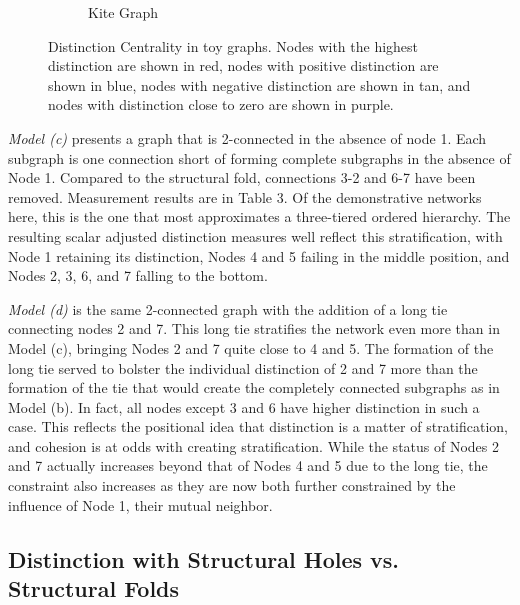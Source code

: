 \documentclass[12pt]{article}
\begin{document}
\begin{figure}
\begin{subfigure}[b]{0.35\textwidth}
            \caption{Kite Graph}
            \label{fig:kite}
    \end{subfigure}
    \caption{Distinction Centrality in toy graphs. Nodes with the highest distinction are shown in red, nodes with positive distinction are shown in blue, nodes with negative distinction are shown in tan, and nodes with distinction close to zero are shown in purple.}
    \label{fig:toys}
\end{figure}








\textit{Model (c)} presents a graph that is 2-connected in the absence of node 1. Each subgraph is one connection short of forming complete subgraphs in the absence of Node 1. Compared to the structural fold, connections 3-2 and 6-7 have been removed. Measurement results are in Table 3. Of the demonstrative networks here, this is the one that most approximates a three-tiered ordered hierarchy. The resulting scalar adjusted distinction measures well reflect this stratification, with Node 1 retaining its distinction, Nodes 4 and 5 failing in the middle position, and Nodes 2, 3, 6, and 7 falling to the bottom. 

\textit{Model (d)} is the same 2-connected graph with the addition of a long tie connecting nodes 2 and 7. This long tie stratifies the network even more than in Model (c), bringing Nodes 2 and 7 quite close to 4 and 5. The formation of the long tie served to bolster the individual distinction of 2 and 7 more than the formation of the tie that would create the completely connected subgraphs as in Model (b). In fact, all nodes except 3 and 6 have higher distinction in such a case. This reflects the positional idea that distinction is a matter of stratification, and cohesion is at odds with creating stratification. While the status of Nodes 2 and 7 actually increases beyond that of Nodes 4 and 5 due to the long tie, the constraint also 
increases as they are now both further constrained by the influence of Node 1, their mutual neighbor.   

\subsection{Distinction with Structural Holes vs. Structural Folds}


\end{document}
